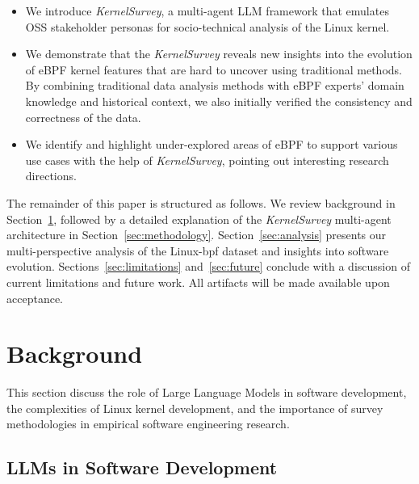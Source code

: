 \documentclass[sigconf,review,anonymous]{acmart}
\newcommand{\sys}{\textit{KernelSurvey}\xspace}
\begin{document}
\begin{itemize}
    \item We introduce \sys, a multi-agent LLM framework that emulates OSS stakeholder personas for socio-technical analysis of the Linux kernel.
    \item We demonstrate that the \emph{\sys} reveals new insights into the evolution of eBPF kernel features that are hard to uncover using traditional methods. By combining traditional data analysis methods with eBPF experts' domain knowledge and historical context, we also initially verified the consistency and correctness of the data.
    \item We identify and highlight under-explored areas of eBPF to support various use cases with the help of \emph{\sys}, pointing out interesting research directions.
\end{itemize}

The remainder of this paper is structured as follows. We review background in Section~\ref{sec:related}, followed by a detailed explanation of the \sys multi-agent architecture in Section~\ref{sec:methodology}. Section~\ref{sec:analysis} presents our multi-perspective analysis of the Linux-bpf dataset and insights into software evolution. Sections~\ref{sec:limitations} and~\ref{sec:future} conclude with a discussion of current limitations and future work. All artifacts will be made available upon acceptance.

\section{Background}
\label{sec:related}

This section discuss the role of Large Language Models in software development, the complexities of Linux kernel development, and the importance of survey methodologies in empirical software engineering research.

\subsection{LLMs in Software Development}
\end{document}
